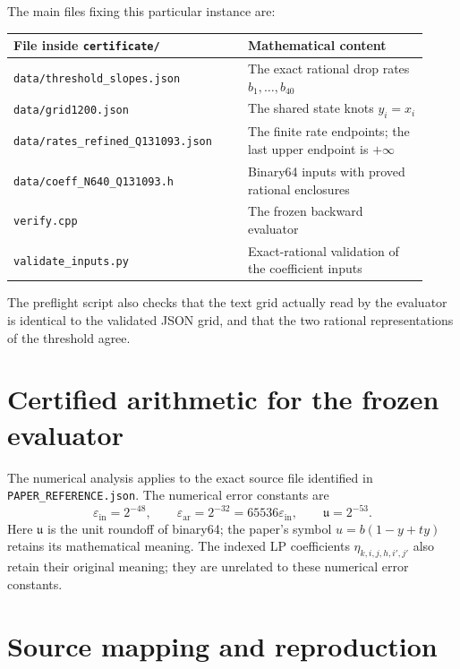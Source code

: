 \documentclass[11pt,a4paper]{article}
\theoremstyle{remark}
\begin{document}
The main files fixing this particular instance are:
\begin{center}
\small
\begin{tabular}{@{}p{0.52\linewidth}p{0.40\linewidth}@{}}
\toprule
File inside \texttt{certificate/} & Mathematical content\\
\midrule
\texttt{data/threshold\_slopes.json} & The exact rational drop rates $b_1,\ldots,b_{40}$\\
\texttt{data/grid1200.json} & The shared state knots $y_i=x_i$\\
\texttt{data/rates\_refined\_Q131093.json} & The finite rate endpoints; the last upper endpoint is $+\infty$\\
\texttt{data/coeff\_N640\_Q131093.h} & Binary64 inputs with proved rational enclosures\\
\texttt{verify.cpp} & The frozen backward evaluator\\
\texttt{validate\_inputs.py} & Exact-rational validation of the coefficient inputs\\
\bottomrule
\end{tabular}
\end{center}
The preflight script also checks that the text grid actually read by the
evaluator is identical to the validated JSON grid, and that the two
rational representations of the threshold agree.



\section{Certified arithmetic for the frozen evaluator}
\label{sec:arithmetic}
The numerical analysis applies to the exact source file identified in
\texttt{PAPER\_REFERENCE.json}. The numerical error constants are
\[
 \varepsilon_{\mathrm{in}}=2^{-48},\qquad
 \varepsilon_{\mathrm{ar}}=2^{-32}
   =65536\varepsilon_{\mathrm{in}},\qquad
 \mathfrak u=2^{-53}.
\]
Here $\mathfrak u$ is the unit roundoff of binary64; the paper's symbol
$u=b(1-y+ty)$ retains its mathematical meaning. The indexed LP
coefficients $\eta_{k,i,j,h,i',j'}$ also retain their original meaning;
they are unrelated to these numerical error constants.




\section{Source mapping and reproduction}
\label{sec:reproduction}

\end{document}
